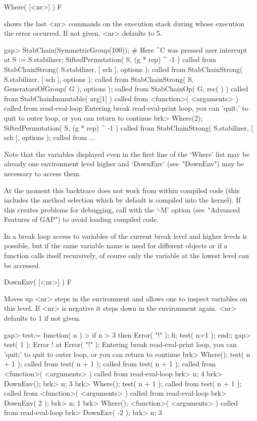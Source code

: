 \>Where( [<nr>] ) F

shows the last <nr> commands on the execution stack during whose execution
the error occurred. If not given, <nr> defaults to 5.

\begintt
gap> StabChain(SymmetricGroup(100));
# Here ^C was pressed
user interrupt at
S := S.stabilizer;
SiftedPermutation( S, (g * rep) ^ -1 ) called from
StabChainStrong( S.stabilizer, [ sch ], options ); called from
StabChainStrong( S.stabilizer, [ sch ], options ); called from
StabChainStrong( S, GeneratorsOfGroup( G ), options ); called from
StabChainOp( G, rec(
     ) ) called from
StabChainImmutable( arg[1] ) called from
<function>( <arguments> ) called from read-eval-loop
Entering break read-eval-print loop, you can 'quit;' to quit to outer loop,
or you can return to continue
brk> Where(2);
SiftedPermutation( S, (g * rep) ^ -1 ) called from
StabChainStrong( S.stabilizer, [ sch ], options ); called from
...
\endtt

Note that the variables displayed even in the first line of the `Where' list
may be already one environment level higher and `DownEnv' (see~"DownEnv")
may be necessary to access them.

At the moment this backtrace does not work from within compiled code (this
includes the method selection which by default is compiled into the kernel).
If this creates problems for debugging, call {\GAP} with the `-M' option
(see~"Advanced Features of GAP") to avoid loading compiled code.


In a break loop access to variables of the current break level and higher
levels is possible, but if the same variable name is used for different
objects or if a function calls itself recursively, of course only the
variable at the lowest level can be accessed.

\>DownEnv( [<nr>] ) F

Moves up <nr> steps in the environment and allows one to inspect variables on
this level. If <nr> is negative it steps down in the environment again. <nr>
defaults to 1 if not given.

\begintt
gap> test:= function( n )
>    if n > 3 then Error( "!" ); fi; test( n+1 ); end;;
gap> test( 1 );
Error ! at
Error( "!" );
Entering break read-eval-print loop,
you can 'quit;' to quit to outer loop,
or you can return to continue
brk> Where();
test( n + 1 ); called from
test( n + 1 ); called from
test( n + 1 ); called from
<function>( <arguments> ) called from read-eval-loop
brk> n;
4
brk> DownEnv();
brk> n;
3
brk> Where();
test( n + 1 ); called from
test( n + 1 ); called from
<function>( <arguments> ) called from read-eval-loop
brk> DownEnv( 2 );
brk> n;
1
brk> Where();
<function>( <arguments> ) called from read-eval-loop
brk> DownEnv( -2 );
brk> n;
3
\endtt

